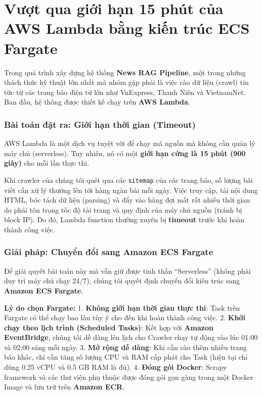 \hypertarget{vux1b0ux1ee3t-qua-giux1edbi-hux1ea1n-15-phuxfat-cux1ee7a-aws-lambda-bux1eb1ng-kiux1ebfn-truxfac-ecs-fargate}{%
\section{Vượt qua giới hạn 15 phút của AWS Lambda bằng kiến trúc ECS
Fargate}}

Trong quá trình xây dựng hệ thống \textbf{News RAG Pipeline}, một trong
những thách thức kỹ thuật lớn nhất mà nhóm gặp phải là việc cào dữ liệu
(crawl) tin tức từ các trang báo điện tử lớn như VnExpress, Thanh Niên
và VietnamNet. Ban đầu, hệ thống được thiết kế chạy trên \textbf{AWS
Lambda}.

\hypertarget{buxe0i-touxe1n-ux111ux1eb7t-ra-giux1edbi-hux1ea1n-thux1eddi-gian-timeout}{%
\subsubsection{Bài toán đặt ra: Giới hạn thời gian
(Timeout)}}

AWS Lambda là một dịch vụ tuyệt vời để chạy mã nguồn mà không cần quản
lý máy chủ (serverless). Tuy nhiên, nó có một \textbf{giới hạn cứng là
15 phút (900 giây)} cho mỗi lần thực thi.

Khi crawler của chúng tôi quét qua các \texttt{sitemap} của các trang
báo, số lượng bài viết cần xử lý thường lên tới hàng ngàn bài mỗi ngày.
Việc truy cập, tải nội dung HTML, bóc tách dữ liệu (parsing) và đẩy vào
hàng đợi mất rất nhiều thời gian do phải tôn trọng tốc độ tải trang và
quy định của máy chủ nguồn (tránh bị block IP). Do đó, Lambda function
thường xuyên bị \textbf{timeout} trước khi hoàn thành công việc.

\hypertarget{giux1ea3i-phuxe1p-chuyux1ec3n-ux111ux1ed5i-sang-amazon-ecs-fargate}{%
\subsubsection{Giải pháp: Chuyển đổi sang Amazon ECS
Fargate}}

Để giải quyết bài toán này mà vẫn giữ được tinh thần ``Serverless''
(không phải duy trì máy chủ chạy 24/7), chúng tôi quyết định chuyển đổi
kiến trúc sang \textbf{Amazon ECS Fargate}.

\textbf{Lý do chọn Fargate:} 1. \textbf{Không giới hạn thời gian thực
thi}: Task trên Fargate có thể chạy bao lâu tùy ý cho đến khi hoàn thành
công việc. 2. \textbf{Khởi chạy theo lịch trình (Scheduled Tasks)}: Kết
hợp với \textbf{Amazon EventBridge}, chúng tôi dễ dàng lên lịch cho
Crawler chạy tự động vào lúc 01:00 và 02:00 sáng mỗi ngày. 3. \textbf{Mở
rộng dễ dàng}: Khi cần cào thêm nhiều trang báo khác, chỉ cần tăng số
lượng CPU và RAM cấp phát cho Task (hiện tại chỉ dùng 0.25 vCPU và 0.5
GB RAM là đủ). 4. \textbf{Đóng gói Docker}: Scrapy framework và các thư
viện phụ thuộc được đóng gói gọn gàng trong một Docker Image và lưu trữ
trên \textbf{Amazon ECR}.

